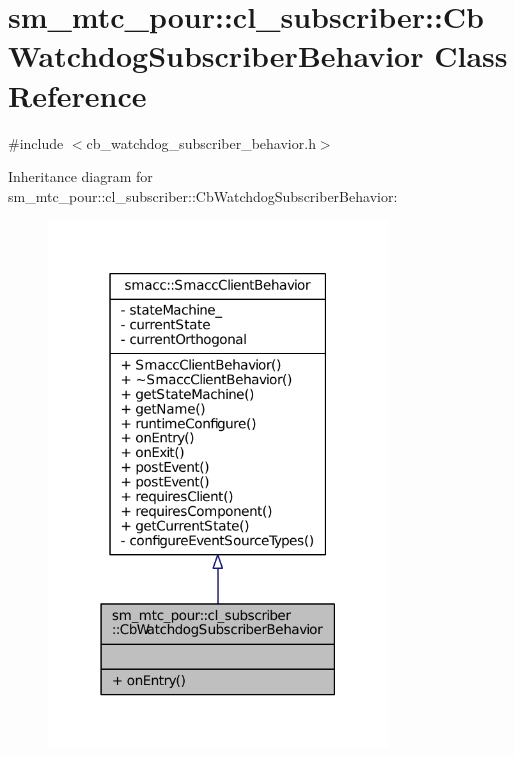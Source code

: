 \hypertarget{classsm__mtc__pour_1_1cl__subscriber_1_1CbWatchdogSubscriberBehavior}{}\section{sm\+\_\+mtc\+\_\+pour\+:\+:cl\+\_\+subscriber\+:\+:Cb\+Watchdog\+Subscriber\+Behavior Class Reference}
\label{classsm__mtc__pour_1_1cl__subscriber_1_1CbWatchdogSubscriberBehavior}


{\ttfamily \#include $<$cb\+\_\+watchdog\+\_\+subscriber\+\_\+behavior.\+h$>$}



Inheritance diagram for sm\+\_\+mtc\+\_\+pour\+:\+:cl\+\_\+subscriber\+:\+:Cb\+Watchdog\+Subscriber\+Behavior\+:
\nopagebreak
\begin{figure}[H]
\begin{center}
\leavevmode
\includegraphics[width=255pt]{classsm__mtc__pour_1_1cl__subscriber_1_1CbWatchdogSubscriberBehavior__inherit__graph}
\end{center}
\end{figure}


